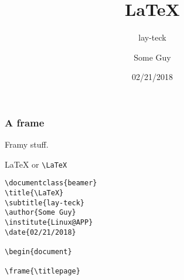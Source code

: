\documentclass{beamer}
\title{\LaTeX}
\subtitle{lay-teck}
\author{Some Guy}
\institute{Linux@APP}
\date{02/21/2018}
\begin{document}
\frame{\titlepage}

\begin{frame}[fragile]
\frametitle{A frame}
Framy stuff.

{\LaTeX} or \verb|\LaTeX|
\begin{verbatim}
\documentclass{beamer}
\title{\LaTeX}
\subtitle{lay-teck}
\author{Some Guy}
\institute{Linux@APP}
\date{02/21/2018}

\begin{document}

\frame{\titlepage}


\end{verbatim}


\end{frame}
\end{document}
